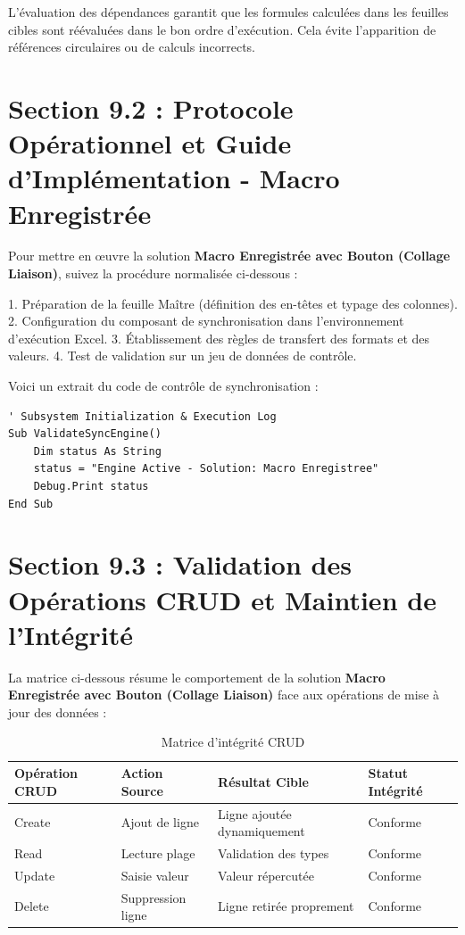 \documentclass[12pt,a4paper]{report}
\begin{document}
L'évaluation des dépendances garantit que les formules calculées dans les feuilles cibles sont réévaluées dans le bon ordre d'exécution. Cela évite l'apparition de références circulaires ou de calculs incorrects.


\section{Section 9.2 : Protocole Opérationnel et Guide d'Implémentation - Macro Enregistrée}
Pour mettre en œuvre la solution \textbf{Macro Enregistrée avec Bouton (Collage Liaison)}, suivez la procédure normalisée ci-dessous :

1. Préparation de la feuille Maître (définition des en-têtes et typage des colonnes).
2. Configuration du composant de synchronisation dans l'environnement d'exécution Excel.
3. Établissement des règles de transfert des formats et des valeurs.
4. Test de validation sur un jeu de données de contrôle.

Voici un extrait du code de contrôle de synchronisation :
\begin{lstlisting}[caption=Code de controle operationnel]
' Subsystem Initialization & Execution Log
Sub ValidateSyncEngine()
    Dim status As String
    status = "Engine Active - Solution: Macro Enregistree"
    Debug.Print status
End Sub
\end{lstlisting}


\section{Section 9.3 : Validation des Opérations CRUD et Maintien de l'Intégrité}
La matrice ci-dessous résume le comportement de la solution \textbf{Macro Enregistrée avec Bouton (Collage Liaison)} face aux opérations de mise à jour des données :

\begin{table}[h]
\centering
\begin{tabular}{@{}llll@{}}
\toprule
\textbf{Opération CRUD} & \textbf{Action Source} & \textbf{Résultat Cible} & \textbf{Statut Intégrité} \\ \midrule
Create & Ajout de ligne & Ligne ajoutée dynamiquement & Conforme \\
Read & Lecture plage & Validation des types & Conforme \\
Update & Saisie valeur & Valeur répercutée & Conforme \\
Delete & Suppression ligne & Ligne retirée proprement & Conforme \\ \bottomrule
\end{tabular}
\caption{Matrice d'intégrité CRUD}
\end{table}
\end{document}
